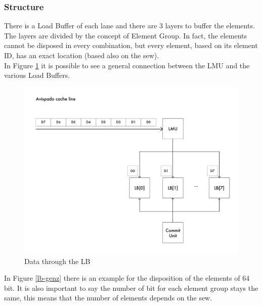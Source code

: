\subsubsection{Structure}
There is a Load Buffer of each lane and there are 3 layers to buffer the elements. The layers are divided by the concept of Element Group. In fact, the elements cannot be disposed in every combination, but every element, based on its element ID, has an exact location (based also on the sew).\\

In Figure \ref{gen-ex} it is possible to see a general connection between the LMU and the various Load Buffers.\\

\begin{figure}[H]
    \centering
    \includegraphics[scale = 0.5]{Chapter_2/img/cache-to-lb-gen-ex.png}
    \caption{Data through the LB}
    \label{gen-ex}
\end{figure}


In Figure \ref{lb-genz} there is an example for the disposition of the elements of 64 bit. It is also important to say the number of bit for each element group stays the same, this means that the number of elements depends on the sew.\\



